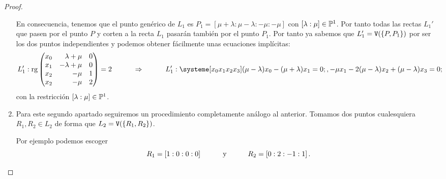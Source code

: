 \documentclass{homeworg}
\begin{document}
\begin{proof}
\begin{enumerate}[label=\roman*)]
     En consecuencia, tenemos que el punto genérico de $L_1$ es $P_1=\left[ \mu+\lambda:\mu-\lambda:-\mu:-\mu \right] $ con $\left[ \lambda:\mu \right] \in \P^1$. Por tanto todas las rectas $L_1'$ que pasen por el punto $P$ y corten a la recta $L_1$ pasarán también por el punto $P_1$. Por tanto ya sabemos que $L_1'=\V\qty(\qty{P,P_1})$ por ser los dos puntos independientes y podemos obtener fácilmente unas ecuaciones implícitas:
     \begin{equation*}
         L_1': \rg\begin{pmatrix*}[r] x_0 & \lambda+\mu & 0 \\ x_1 & -\lambda+\mu & 0 \\ x_2 & -\mu & 1 \\ x_2 & -\mu & 2 \end{pmatrix*}=2
         \hmidthen L_{1}':\systeme[x_{0}x_{1}x_{2}x_{3}]{{(\mu-\lambda)} x_{0}-{(\mu+\lambda)} x_{1}=0;,-{\mu} x_{1}-{2(\mu-\lambda)} x_{2}+{(\mu-\lambda)}x_{3}=0;}
     \end{equation*}
     con la restricción $[\lambda:\mu]\in\P^{1}$.
     
     \clearpage
     
     \item Para este segundo apartado seguiremos un procedimiento completamente análogo al anterior. Tomamos dos puntos cualesquiera $R_1,R_2 \in L_2$ de forma que $L_2=\V(\{R_1,R_2\})$. 
     
     Por ejemplo podemos escoger $$R_1=\left[1:0:0:0\right]\hmid\text{y}\hmid R_2=\left[0:2:-1:1\right].$$ 
     

\end{enumerate}
\end{proof}
\end{document}
